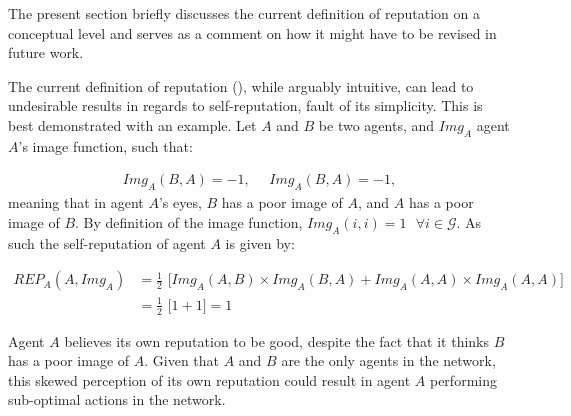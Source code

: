 The present section briefly discusses the current definition of reputation on a conceptual level and serves as a comment on how it might have to be revised in future work. 

The current definition of reputation (), while arguably intuitive, can lead to undesirable results in regards to self-reputation, fault of its simplicity. This is best demonstrated with an example. Let $A$ and $B$ be two agents, and $Img_A$ agent $A$'s image function, such that:

\begin{align}
    Img_A(B, A) = -1, \,\,\,\,\,\,\,\, Img_A(B,A) = -1,
\end{align}
meaning that in agent $A$'s eyes, $B$ has a poor image of $A$, and $A$ has a poor image of $B$. By definition of the image function, $Img_A(i,i) = 1 \,\,\,\, \forall i \in \mathcal{G}$. As such the self-reputation of agent $A$ is given by:

\begin{align*}
\label{eq:selfrep}
    REP_A(A, Img_A) &= \frac{1}{2} \,\, \big[ Img_A(A,B) \times Img_A(B,A) + Img_A(A,A) \times Img_A(A,A) \big]
    \\&= \frac{1}{2} \,\, \big[ 1 + 1\big] = 1
\end{align*}

Agent $A$ believes its own reputation to be good, despite the fact that it thinks $B$ has a poor image of $A$. Given that $A$ and $B$ are the only agents in the network, this skewed perception of its own reputation could result in agent $A$ performing sub-optimal actions in the network.
